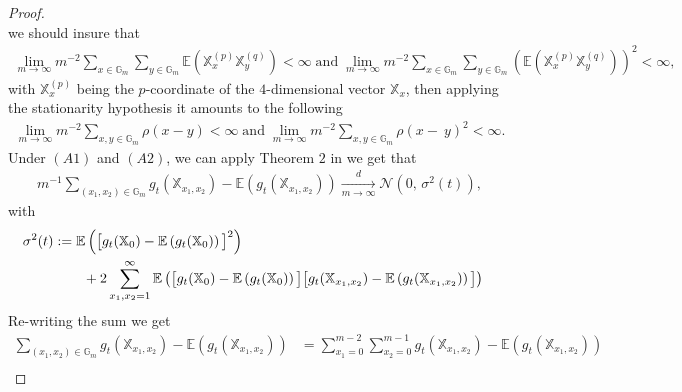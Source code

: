 \documentclass[12pt]{article}
\theoremstyle{Theorem}
\begin{document}
\begin{proof}
\big[\textcolor{blue}{ $r^{(p,q )}(k) = \mathbb{E}\left(X^{p}_{m} X^{q}_{m+k}\right)$for $k\in Z$ and $1 < p, q < d$, where $m$ is any integer so large that $m, m + k > 1$. Suppose that \\
$\lim_{n \to \infty} n^{-1} \sum_{j,k = 1}^{n}r^{(p,q )}(j-k) < \infty$ and $\lim_{m \to \infty} n^{-1}\sum_{j,k = 1}^{n}(r^{(p,q )}(j-k))^{2} < \infty$}\big]\\
we should insure that 
\begin{align*}
\lim_{m \to \infty} m^{-2} \sum_{x \in \mathbb{G}_{m}}\sum_{y \in \mathbb{G}_{m}} \mathbb{E}\left(\mathbb{X}^{(p)}_{x}\mathbb{X}^{(q)}_{y}\right) < \infty \; \text{and} \; \lim_{m \to \infty} m^{-2} \sum_{x \in \mathbb{G}_{m}}\sum_{y \in \mathbb{G}_{m}} \left(\mathbb{E}\left(\mathbb{X}^{(p)}_{x}\mathbb{X}^{(q)}_{y}\right)\right)^{2} < \infty,
\end{align*} 
with $\mathbb{X}^{(p)}_{x}$ being the $p$-coordinate of the $4$-dimensional vector $\mathbb{X}_{x}$, then applying the stationarity hypothesis it amounts to the following
\begin{align*}
\lim_{m \to \infty} m^{-2}\sum_{x, y \in \mathbb{G}_{m}}\rho(x-y) < \infty \;  \text{and} \; \lim_{m \to \infty} m^{-2}\sum_{x, y \in \mathbb{G}_{m}}\rho(x-~y)^{2} < \infty.
\end{align*} 
Under $(A1)$ and $(A2)$, we can apply Theorem $2$ in \cite{arcones} we get that 
\begin{align*}
m^{-1} \sum_{(x_1, x_2) \in \mathbb{G}_{m}} g_{\scriptscriptstyle t}\left(\mathbb{X}_{x_1, x_2}\right) - \mathbb{E}\left(g_{\scriptscriptstyle t}\left(\mathbb{X}_{x_1, x_2}\right)\right) \xrightarrow[m \to \infty]{d} \mathcal{N}\left(0,\,\sigma^{2}(t)\right),
\end{align*}
with 
\begin{align*}
\sigma^{2}(t) := \mathbb{E}\left(\big[g_{t}(\mathbb{X}_{0}) - \mathbb{E}\left(g_{t}(\mathbb{X}_{0})\right)\big]^{2}\right) \\
& \hspace{-4cm}+ 2 \sum_{x_{1}, x_{2} = 1}^{\infty} \mathbb{E}\left(\big[g_{t}(\mathbb{X}_{0}) - \mathbb{E}\left(g_{t}(\mathbb{X}_{0})\right)\big]\big[g_{t}(\mathbb{X}_{x_1,x_2}) - \mathbb{E}\left(g_{t}(\mathbb{X}_{x_1, x_2})\right)\big]\right)
\end{align*}
Re-writing the sum we get
\begin{align*} 
\sum_{(x_1, x_2) \in \mathbb{G}_{m}} g_{t}\left(\mathbb{X}_{x_1, x_2}\right) - \mathbb{E}\left(g_{t}\left(\mathbb{X}_{x_1, x_2}\right)\right) & = \sum_{x_1 = 0}^{m-2}\sum_{x_2 = 0}^{m-1} g_{t}\left(\mathbb{X}_{x_1, x_2}\right) - \mathbb{E}\left(g_{t}\left(\mathbb{X}_{x_1, x_2}\right)\right) \\

\end{align*}
\end{proof}
\end{document}
